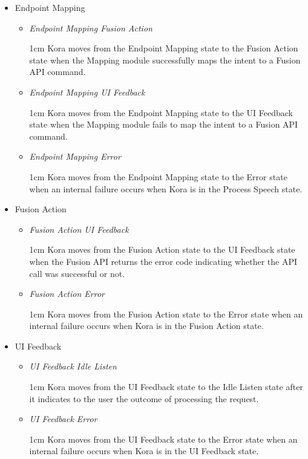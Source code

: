 \documentclass[onecolumn, draftclsnofoot,10pt, compsoc]{IEEEtran}
\newenvironment{indentItem}[1][1cm]{\begin{adjustwidth}{#1}{}}{\end{adjustwidth}}
\begin{document}
\begin{itemize}
		\item Endpoint Mapping
		\begin{itemize}
			\item \textit{Endpoint Mapping \textrightarrow{} Fusion Action}
			\begin{indentItem}
				Kora moves from the Endpoint Mapping state to the Fusion Action state when the Mapping module successfully maps the intent to a Fusion API command.
			\end{indentItem}
			\item \textit{Endpoint Mapping \textrightarrow{} UI Feedback}
			\begin{indentItem}
				Kora moves from the Endpoint Mapping state to the UI Feedback state when the Mapping module fails to map the intent to a Fusion API command.
			\end{indentItem}
			\item \textit{Endpoint Mapping \textrightarrow{} Error}
			\begin{indentItem}
				Kora moves from the Endpoint Mapping state to the Error state when an internal failure occurs when Kora is in the Process Speech state.
			\end{indentItem}
		\end{itemize}
		
		\item Fusion Action
		\begin{itemize}
			\item \textit{Fusion Action \textrightarrow{} UI Feedback}
			\begin{indentItem}
				Kora moves from the Fusion Action state to the UI Feedback state when the Fusion API returns the error code indicating whether the API call was successful or not.
			\end{indentItem}
			\item \textit{Fusion Action \textrightarrow{} Error}
			\begin{indentItem}
				Kora moves from the Fusion Action state to the Error state when an internal failure occurs when Kora is in the Fusion Action state.
			\end{indentItem}
		\end{itemize}
		
		\item UI Feedback
		\begin{itemize}
			\item \textit{UI Feedback \textrightarrow{} Idle Listen}
			\begin{indentItem}
				Kora moves from the UI Feedback state to the Idle Listen state after it indicates to the user the outcome of processing the request.
			\end{indentItem}
			\item \textit{UI Feedback \textrightarrow{} Error}
			\begin{indentItem}
				Kora moves from the UI Feedback state to the Error state when an internal failure occurs when Kora is in the UI Feedback state.
			\end{indentItem}
		\end{itemize}
		

\end{itemize}
\end{document}

